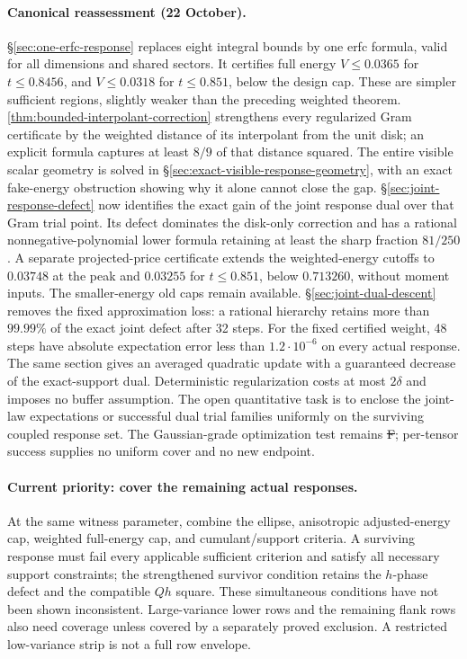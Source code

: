 \paragraph{Canonical reassessment (22 October).}
\S\ref{sec:one-erfc-response} replaces eight integral bounds by one erfc
formula, valid for all dimensions and shared sectors. It certifies full
energy $V\le0.0365$ for $t\le0.8456$, and $V\le0.0318$ for
$t\le0.851$, below the design cap. These are simpler sufficient regions,
slightly weaker than the preceding weighted theorem.
\autoref{thm:bounded-interpolant-correction} strengthens every regularized
Gram certificate by the weighted distance of its interpolant from the
unit disk; an explicit formula captures at least $8/9$ of that distance
squared. The entire visible scalar geometry is solved in
\S\ref{sec:exact-visible-response-geometry}, with an exact fake-energy
obstruction showing why it alone cannot close the gap.
\S\ref{sec:joint-response-defect} now identifies the exact gain of the
joint response dual over that Gram trial point. Its defect dominates the
disk-only correction and has a rational nonnegative-polynomial lower
formula retaining at least the sharp fraction $81/250$. A separate
projected-price certificate extends the weighted-energy cutoffs to
$0.03748$ at the peak and $0.03255$ for $t\le0.851$, below $0.713260$,
without moment inputs. The smaller-energy old caps remain available.
\S\ref{sec:joint-dual-descent} removes the fixed approximation loss:
a rational hierarchy retains more than $99.99\%$ of the exact joint
defect after 32 steps.
For the fixed certified weight, 48 steps have absolute expectation error
less than $1.2\cdot10^{-6}$ on every actual response.
The same section gives an averaged quadratic update with
a guaranteed decrease of the exact-support dual. Deterministic
regularization costs at most $2\delta$ and imposes no buffer assumption.
The open quantitative task is to enclose the joint-law expectations or
successful dual trial families uniformly on the surviving coupled
response set. The Gaussian-grade optimization test remains \st{F};
per-tensor success supplies no uniform cover and no new endpoint.

\paragraph{Current priority: cover the remaining actual responses.}
At the same witness parameter, combine the ellipse, anisotropic adjusted-energy
cap, weighted full-energy cap, and cumulant/support criteria. A surviving response must fail every
applicable sufficient criterion and satisfy all necessary support constraints;
the strengthened survivor condition retains the $h$-phase defect and the
compatible $Qh$ square. These simultaneous conditions have not been shown
inconsistent. Large-variance lower rows and the remaining flank rows also
need coverage unless covered by a separately proved exclusion. A restricted
low-variance strip is not a full row envelope.

